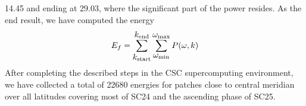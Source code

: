 \documentclass{aa}
\begin{document}
14.45 and ending at 29.03, 
where the significant part of the \fff power resides. 
As the end result, we have computed the \fff energy
\begin{equation}
E_f=
\sum_{\mbox{$k_{\rm start}$}}^{\mbox{$k_{\rm end}$}}
\sum_{\mbox{$\omega_{\rm min}$}}^{\mbox{$\omega_{\rm max}$}} P(\omega,k)
\end{equation}
After completing the described steps in the CSC supercomputing
environment, we have collected a total of 
22680
\fff
energies
for patches close to central meridian over all latitudes covering 
most of SC24 and the ascending phase of SC25.
\end{document}
